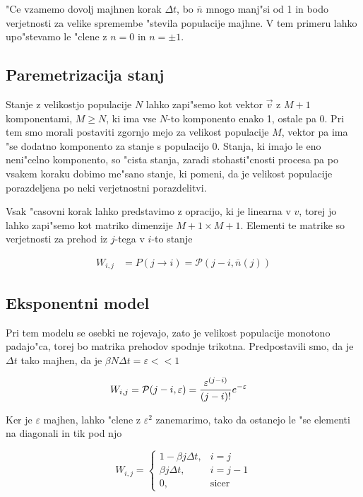 \documentclass[a4paper,10pt]{article}
\newcommand{\eps}{\varepsilon}
\begin{document}
"Ce vzamemo dovolj majhnen korak $\Delta t$, bo $\overline{n}$ mnogo manj"si od 1 in bodo verjetnosti za velike spremembe "stevila populacije majhne. V tem primeru lahko upo"stevamo le "clene z $n=0$ in $n = \pm 1$. 

\subsection{Paremetrizacija stanj}

Stanje z velikostjo populacije $N$ lahko zapi"semo kot vektor $\vec v$ z $M+1$ komponentami, $M \geq N$, ki ima vse $N$-to komponento enako 1, ostale pa 0. Pri tem smo morali postaviti zgornjo mejo za velikost populacije $M$, vektor pa ima "se dodatno komponento za stanje s populacijo 0. Stanja, ki imajo le eno neni"celno komponento, so "cista stanja, zaradi stohasti"cnosti procesa pa po vsakem koraku dobimo me"sano stanje, ki pomeni, da je velikost populacije porazdeljena po neki verjetnostni porazdelitvi. 

Vsak "casovni korak lahko predstavimo z opracijo, ki je linearna v $v$, torej jo lahko zapi"semo kot matriko dimenzije $M+1\times M+1$. Elementi te matrike so verjetnosti za prehod iz $j$-tega v $i$-to stanje

\begin{align}
W_{i,j} &= P(j\to i) = \mathcal P(j-i, \overline{n}(j))
\end{align}

\subsection{Eksponentni model}

Pri tem modelu se osebki ne rojevajo, zato je velikost populacije monotono padajo"ca, torej bo matrika prehodov spodnje trikotna. Predpostavili smo, da je $\Delta t$ tako majhen, da je $\beta N \Delta t = \eps << 1$

\begin{align}
  W_{i,j} &= \mathcal{P}(j-i, \eps) = \poisson{(j-i)}{\eps}
\end{align}

Ker je $\eps$ majhen, lahko "clene z $\eps^2$ zanemarimo, tako da ostanejo le "se elementi na diagonali in tik pod njo

\begin{equation}
  W_{i,j} = \left\{ \begin{matrix} 
		      1 - \beta j \Delta t, & i=j \\
                      \beta j \Delta t, & i=j-1 \\
		      0, & \mathrm{sicer}
                    \end{matrix}\right.
\end{equation}
\end{document}
